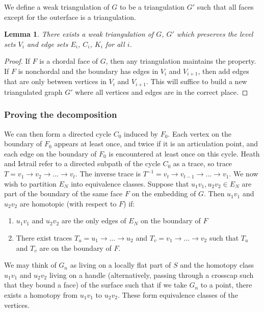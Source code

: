 \documentclass[]{report}
\newtheorem{lemma}[theorem]{Lemma}
\theoremstyle{definition}
\numberwithin{theorem}{section}
\numberwithin{equation}{section}
\begin{document}
We define a weak triangulation of $G$ to be a triangulation $G'$ such that all faces except for the outerface is a triangulation.
\begin{lemma}
	There exists a weak triangulation of $G$, $G'$ which preserves the level sets $V_i$ and edge sets $E_i$, $C_i$, $K_i$ for all $i$. 
\end{lemma}

\begin{proof}
	If $F$ is a chordal face of $G$, then any triangulation maintains the property. If $F$ is nonchordal and the boundary has edges in $V_i$ and $V_{i + 1}$, then add edges that are only between vertices in $V_i$ and $V_{i + 1}$. This will suffice to build a new triangulated graph $G'$ where all vertices and edges are in the correct place. 
\end{proof}

\subsubsection{Proving the decomposition}

We can then form a directed cycle $C_0$ induced by $F_0$. Each vertex on the boundary of $F_0$ appears at least once, and twice if it is an articulation point, and each edge on the boundary of $F_0$ is encountered at least once on this cycle. Heath and Istrail refer to a directed subpath of the cycle $C_0$ as a trace, so trace $T = v_1 \rightarrow v_2 \rightarrow ... \rightarrow v_t$. The inverse trace is $T^{-1} = v_t \rightarrow v_{t-1} \rightarrow ... \rightarrow v_1$. We now wish to partition $E_N$ into equivalence classes. Suppose that $u_1v_1, u_2v_2 \in E_N$ are part of the boundary of the same face $F$ on the embedding of $G$. Then $u_1v_1$ and $u_2v_2$ are homotopic (with respect to $F$) if:
\begin{enumerate}
	\item $u_1v_1$ and $u_2v_2$ are the only edges of $E_N$ on the boundary of $F$
	\item There exist traces $T_u = u_1 \rightarrow ... \rightarrow u_2$ and $T_v = v_1 \rightarrow ... \rightarrow v_2$ such that $T_u$ and $T_v$ are on the boundary of $F$.
\end{enumerate}
We may think of $G_n$ as living on a locally flat part of $S$ and the homotopy class $u_1v_1$ and $u_2 v_2$ living on a handle (alternatively, passing through a crosscap such that they bound a face) of the surface such that if we take $G_n$ to a point, there exists a homotopy from $u_1v_1$ to $u_2v_2$. These form equivalence classes of the vertices.
\end{document}
